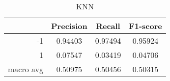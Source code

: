 \begin{table}[!h]
    \centering
    \renewcommand{\arraystretch}{1.5}
    \begin{tabular}{|r|c|c|c|}
        \hline
                  & Precision & Recall & F1-score \\ \hline
        -1        &     0.94403     &     0.97494   &    0.95924      \\ \hline
        1         &     0.07547      &     0.03419   &   0.04706       \\ \hline
        macro avg &      0.50975     &     0.50456   &    0.50315      \\ \hline
    \end{tabular}
    \caption{KNN}
\end{table}
